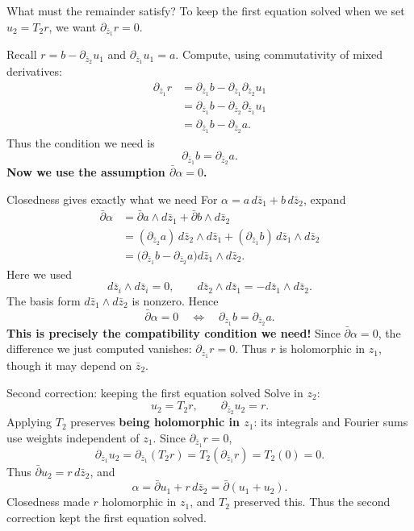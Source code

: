 \documentclass[aspectratio=169,11pt]{beamer}
\newcommand{\db}{\bar\partial}
\begin{document}
\begin{frame}{What must the remainder satisfy?}
To keep the first equation solved when we set $u_2=T_2r$,
we want $\partial_{\bar z_1}r=0$.

Recall $r=b-\partial_{\bar z_2}u_1$ and $\partial_{\bar z_1}u_1=a$.
Compute, using commutativity of mixed derivatives:
\[
 \begin{aligned}
 \partial_{\bar z_1}r
 &=\partial_{\bar z_1}b
   -\partial_{\bar z_1}\partial_{\bar z_2}u_1\\
 &=\partial_{\bar z_1}b
   -\partial_{\bar z_2}\partial_{\bar z_1}u_1\\
 &=\partial_{\bar z_1}b-\partial_{\bar z_2}a.
 \end{aligned}
\]
Thus the condition we need is
\[
 \partial_{\bar z_1}b=\partial_{\bar z_2}a.
\]
\textbf{Now we use the assumption $\db\alpha=0$.}
\end{frame}

\begin{frame}{Closedness gives exactly what we need}
For $\alpha=a\,d\bar z_1+b\,d\bar z_2$, expand
\[
 \begin{aligned}
 \db\alpha
 &=\db a\wedge d\bar z_1+\db b\wedge d\bar z_2\\
 &=(\partial_{\bar z_2}a)\,d\bar z_2\wedge d\bar z_1
  +(\partial_{\bar z_1}b)\,d\bar z_1\wedge d\bar z_2\\
 &=\bigl(\partial_{\bar z_1}b-\partial_{\bar z_2}a\bigr)
       d\bar z_1\wedge d\bar z_2.
 \end{aligned}
\]
Here we used
\[
 d\bar z_i\wedge d\bar z_i=0,\qquad
 d\bar z_2\wedge d\bar z_1=-d\bar z_1\wedge d\bar z_2.
\]
The basis form $d\bar z_1\wedge d\bar z_2$ is nonzero. Hence
\[
 \boxed{\db\alpha=0\quad\Longleftrightarrow\quad
 \partial_{\bar z_1}b=\partial_{\bar z_2}a.}
\]
\textbf{This is precisely the compatibility condition we need!}
Since $\db\alpha=0$, the difference we just computed vanishes:
$\partial_{\bar z_1}r=0$.
Thus $r$ is holomorphic in $z_1$, though it may depend on $\bar z_2$.
\end{frame}

\begin{frame}{Second correction: keeping the first equation solved}
Solve in $z_2$:
\[
 u_2=T_2r,\qquad \partial_{\bar z_2}u_2=r.
\]
Applying $T_2$ preserves \textbf{being holomorphic in $z_1$}:
its integrals and Fourier sums use weights independent of $z_1$.
Since $\partial_{\bar z_1}r=0$,
\[
 \partial_{\bar z_1}u_2
 =\partial_{\bar z_1}(T_2r)
 =T_2(\partial_{\bar z_1}r)=T_2(0)=0.
\]
Thus $\db u_2=r\,d\bar z_2$, and
\[
 \boxed{\alpha=\db u_1+r\,d\bar z_2=\db(u_1+u_2).}
\]
Closedness made $r$ holomorphic in $z_1$, and $T_2$ preserved this.
Thus the second correction kept the first equation solved.
\end{frame}
\end{document}
